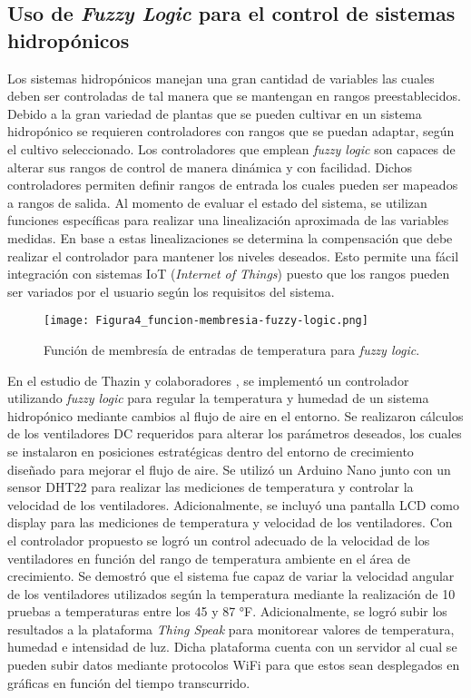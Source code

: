 \subsection*{Uso de \textit{Fuzzy Logic} para el control de sistemas hidropónicos}
Los sistemas hidropónicos manejan una gran cantidad de variables las cuales deben ser controladas de tal manera que se mantengan en rangos preestablecidos. Debido a la gran variedad de plantas que se pueden cultivar en un sistema hidropónico se requieren controladores con rangos que se puedan adaptar, según el cultivo seleccionado. Los controladores que emplean \textit{fuzzy logic} son capaces de alterar sus rangos de control de manera dinámica y con facilidad. Dichos controladores permiten definir rangos de entrada los cuales pueden ser mapeados a rangos de salida. Al momento de evaluar el estado del sistema, se utilizan funciones específicas para realizar una linealización aproximada de las variables medidas. En base a estas linealizaciones se determina la compensación que debe realizar el controlador para mantener los niveles deseados. Esto permite una fácil integración con sistemas IoT (\textit{Internet of Things}) puesto que los rangos pueden ser variados por el usuario según los requisitos del sistema.

\begin{figure}[H]
	\centering
	\texttt{[image: Figura4\_funcion-membresia-fuzzy-logic.png]}
	\caption{Función de membresía de entradas de temperatura para \textit{fuzzy logic}. \cite{thazin_iot_2019}}
	\label{fig:mesh3}
\end{figure}

\indent En el estudio de Thazin y colaboradores \cite{thazin_iot_2019}, se implementó un controlador utilizando \textit{fuzzy logic} para regular la temperatura y humedad de un sistema hidropónico mediante cambios al flujo de aire en el entorno. Se realizaron cálculos de los ventiladores DC requeridos para alterar los parámetros deseados, los cuales se instalaron en posiciones estratégicas dentro del entorno de crecimiento diseñado para mejorar el flujo de aire. Se utilizó un Arduino Nano junto con un sensor DHT22 para realizar las mediciones de temperatura y controlar la velocidad de los ventiladores. Adicionalmente, se incluyó una pantalla LCD como display para las mediciones de temperatura y velocidad de los ventiladores. Con el controlador propuesto se logró un control adecuado de la velocidad de los ventiladores en función del rango de temperatura ambiente en el área de crecimiento. Se demostró que el sistema fue capaz de variar la velocidad angular de los ventiladores utilizados según la temperatura mediante la realización de 10 pruebas a temperaturas entre los 45 y 87 °F. Adicionalmente, se logró subir los resultados a la plataforma \textit{Thing Speak} para monitorear valores de temperatura, humedad e intensidad de luz. Dicha plataforma cuenta con un servidor al cual se pueden subir datos mediante protocolos WiFi para que estos sean desplegados en gráficas en función del tiempo transcurrido.

